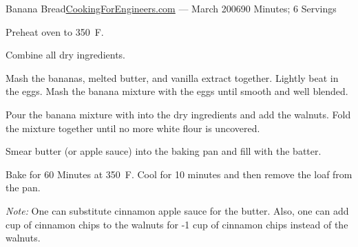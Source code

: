 \documentclass{article}
\begin{document}
\begin{recipe}{Banana Bread}{\href{http://www.cookingforengineers.com/recipe/108/Banana-Nut-Bread}{CookingForEngineers.com} --- March 2006}{90 Minutes; 6 Servings}

   \newstep
   Preheat oven to 350\ \0F.

   Combine all dry ingredients.

   Mash the bananas, melted butter, and vanilla extract together.  Lightly beat
   in the eggs.  Mash the banana mixture with the eggs until smooth and well
   blended.

   Pour the banana mixture with into the dry ingredients and add the walnuts.
   Fold the mixture together until no more white flour is uncovered.

   Smear butter (or apple sauce) into the baking pan and fill with the batter.

   \newstep
   Bake for 60 Minutes at 350\ \0F.  Cool for 10 minutes and then remove the
   loaf from the pan.

   \freeform
   \emph{Note:} One can substitute cinnamon apple sauce for the butter.  Also,
   one can add  cup of cinnamon chips to the walnuts for -1 cup of
   cinnamon chips instead of the walnuts.

\end{recipe}
\end{document}

